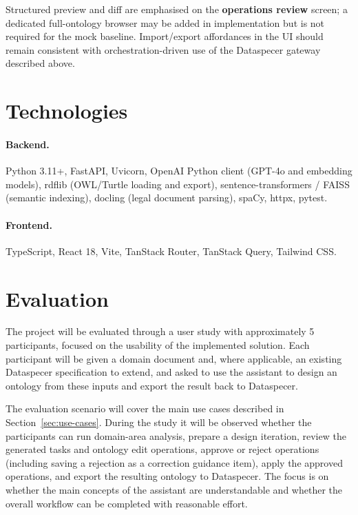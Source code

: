 \documentclass{article}
\begin{document}
Structured preview and diff are emphasised on the \textbf{operations review} screen; a dedicated full-ontology browser may be added in implementation but is not required for the mock baseline. Import/export affordances in the UI should remain consistent with orchestration-driven use of the Dataspecer gateway described above.


\section{Technologies}

\paragraph{Backend.}
Python 3.11+, FastAPI, Uvicorn, OpenAI Python client (GPT-4o and embedding models), rdflib (OWL/Turtle loading and export), sentence-transformers / FAISS (semantic indexing), docling (legal document parsing), spaCy, httpx, pytest.

\paragraph{Frontend.}
TypeScript, React 18, Vite, TanStack Router, TanStack Query, Tailwind CSS.

\section{Evaluation}
\label{sec:evaluation}

The project will be evaluated through a user study with approximately 5 participants, focused on the usability of the implemented solution. Each participant will be given a domain document and, where applicable, an existing Dataspecer specification to extend, and asked to use the assistant to design an ontology from these inputs and export the result back to Dataspecer.

The evaluation scenario will cover the main use cases described in Section~\ref{sec:use-cases}. During the study it will be observed whether the participants can run domain-area analysis, prepare a design iteration, review the generated tasks and ontology edit operations, approve or reject operations (including saving a rejection as a correction guidance item), apply the approved operations, and export the resulting ontology to Dataspecer. The focus is on whether the main concepts of the assistant are understandable and whether the overall workflow can be completed with reasonable effort.
\end{document}
